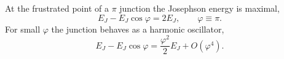 \documentclass{article}
\begin{document}
At the frustrated point of a $\pi$ junction the Josephson energy is maximal,
\begin{equation}
E_J - E_J\cos\varphi = 2E_J, \qquad \varphi \equiv \pi .
\label{eq:pi}
\end{equation}
For small $\varphi$ the junction behaves as a harmonic oscillator,
\begin{equation}
E_J - E_J\cos\varphi = \frac{\varphi^2}{2}E_J + O(\varphi^4) .
\label{eq:harm}
\end{equation}
\end{document}
